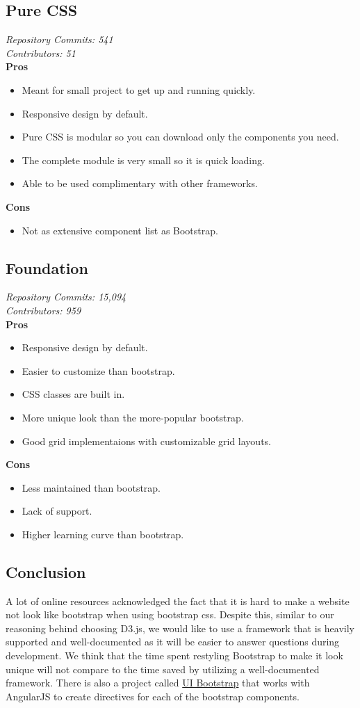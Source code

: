 \documentclass[onecolumn, draftclsnofoot,10pt, compsoc]{IEEEtran}
\begin{document}
\subsection{Pure CSS}
\textit{Repository Commits: 541}\\ 
\textit{Contributors: 51}\\
\textbf{Pros}
\begin{itemize}
    \item Meant for small project to get up and running quickly.
    \item Responsive design by default.
    \item Pure CSS is modular so you can download only the components you need.
    \item The complete module is very small so it is quick loading.
    \item Able to be used complimentary with other frameworks.
\end{itemize}
\textbf{Cons} 
\begin{itemize}
    \item Not as extensive component list as Bootstrap.
\end{itemize}
\subsection{Foundation}
\textit{Repository Commits: 15,094}\\ 
\textit{Contributors: 959}\\
\textbf{Pros}
\begin{itemize}
    \item Responsive design by default.
    \item Easier to customize than bootstrap.
    \item CSS classes are built in. \cite{team_2015}
    \item More unique look than the more-popular bootstrap.
    \item Good grid implementaions with customizable grid layouts.
\end{itemize}
\textbf{Cons}
\begin{itemize}
    \item Less maintained than bootstrap.
    \item Lack of support.
    \item Higher learning curve than bootstrap.
\end{itemize}
\subsection{Conclusion}
A lot of online resources acknowledged the fact that it is hard to make a website not look like bootstrap when using bootstrap css. Despite this, similar to our reasoning behind choosing D3.js, we would like to use a framework that is heavily supported and well-documented as it will be easier to answer questions during development. We think that the time spent restyling Bootstrap to make it look unique will not compare to the time saved by utilizing a well-documented framework. There is also a project called \href{https://angular-ui.github.io/bootstrap/}{UI Bootstrap} that works with AngularJS to create directives for each of the bootstrap components. \cite{sevilayha_2015}


\end{document}
